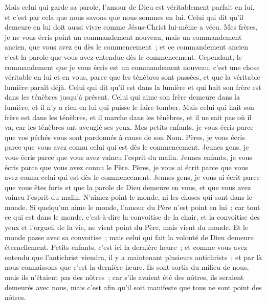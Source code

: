 \begin{multicols}{2}
Mais celui qui garde sa parole, l'amour de Dieu est véritablement parfait en lui, et c'est par cela que nous savons que nous sommes en lui.
Celui qui dit qu'il demeure en lui doit aussi vivre comme Jésus-Christ lui-même a vécu.
Mes frères, je ne vous écris point un commandement nouveau, mais un commandement ancien, que vous avez eu dès le commencement~; et ce commandement ancien c'est la parole que vous avez entendue dès le commencement.
Cependant, le commandement que je vous écris est un commandement nouveau, c'est une chose véritable en lui et en vous, parce que les ténèbres sont passées, et que la véritable lumière paraît déjà.
Celui qui dit qu'il est dans la lumière et qui hait son frère est dans les ténèbres jusqu'à présent.
Celui qui aime son frère demeure dans la lumière, et il n'y a rien en lui qui puisse le faire tomber.
Mais celui qui hait son frère est dans les ténèbres, et il marche dans les ténèbres, et il ne sait pas où il va, car les ténèbres ont aveuglé ses yeux.
Mes petits enfants, je vous écris parce que vos péchés vous sont pardonnés à cause de son Nom.
Pères, je vous écris parce que vous avez connu celui qui est dès le commencement. Jeunes gens, je vous écris parce que vous avez vaincu l'esprit du malin.
Jeunes enfants, je vous écris parce que vous avez connu le Père. Pères, je vous ai écrit parce que vous avez connu celui qui est dès le commencement. Jeunes gens, je vous ai écrit parce que vous êtes forts et que la parole de Dieu demeure en vous, et que vous avez vaincu l'esprit du malin.
N'aimez point le monde, ni les choses qui sont dans le monde. Si quelqu'un aime le monde, l'amour du Père n'est point en lui~;
car tout ce qui est dans le monde, c'est-à-dire la convoitise de la chair, et la convoitise des yeux et l'orgueil de la vie, ne vient point du Père, mais vient du monde.
Et le monde passe avec sa convoitise~; mais celui qui fait la volonté de Dieu demeure éternellement.
Petits enfants, c'est ici la dernière heure~; et comme vous avez entendu que l'antichrist viendra, il y a maintenant plusieurs antichrists~; et par là nous connaissons que c'est la dernière heure.
Ils sont sortis du milieu de nous, mais ils n'étaient pas des nôtres~; car s'ils avaient été des nôtres, ils seraient demeurés avec nous, mais c'est afin qu'il soit manifeste que tous ne sont point des nôtres.

\end{multicols}
